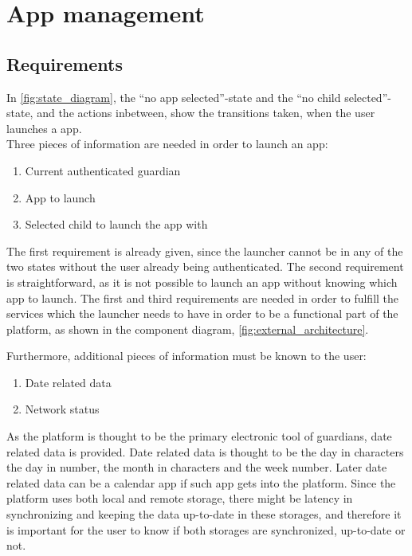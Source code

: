 \section{App management}
\label{sec:app_management}

\subsection{Requirements}
\label{sec:appman_requirements}

In \autoref{fig:state_diagram}, the ``no app selected''-state and the ``no child selected''-state, and the actions inbetween, show the transitions taken, when the user launches a \giraf[] app. \\


\noindent Three pieces of information are needed in order to launch an app:

\begin{enumerate}
	\item Current authenticated guardian
	\item App to launch
	\item Selected child to launch the app with
\end{enumerate}

The first requirement is already given, since the launcher cannot be in any of the two states without the user already being authenticated.
The second requirement is straightforward, as it is not possible to launch an app without knowing which app to launch.
The first and third requirements are needed in order to fulfill the services which the launcher needs to have in order to be a functional part of the \giraf[] platform, as shown in the component diagram, \autoref{fig:external_architecture}.

Furthermore, additional pieces of information must be known to the user:

\begin{enumerate}
	\item Date related data
	\item Network status 
\end{enumerate}

As the \giraf[] platform is thought to be the primary electronic tool of guardians, date related data is provided. Date related data is thought to be the day in characters the day in number, the month in characters and the week number. Later date related data can be a calendar app if such app gets into the \giraf[] platform.
Since the \giraf[] platform uses both local and remote storage, there might be latency in synchronizing and keeping the data up-to-date in these storages, and therefore it is important for the user to know if both storages are synchronized, up-to-date or not.

